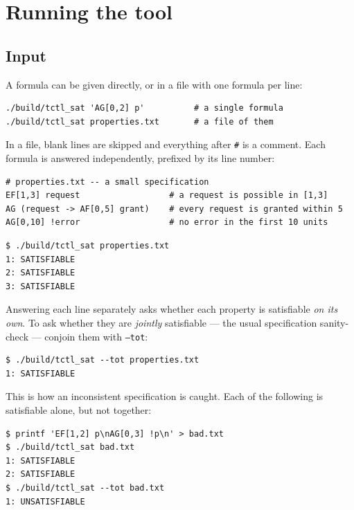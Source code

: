 \section{Running the tool}

\subsection{Input}

A formula can be given directly, or in a file with one formula per line:

\begin{lstlisting}
./build/tctl_sat 'AG[0,2] p'          # a single formula
./build/tctl_sat properties.txt       # a file of them
\end{lstlisting}

\noindent
In a file, blank lines are skipped and everything after \texttt{\#} is a
comment.  Each formula is answered independently, prefixed by its line number:

\begin{lstlisting}
# properties.txt -- a small specification
EF[1,3] request                  # a request is possible in [1,3]
AG (request -> AF[0,5] grant)    # every request is granted within 5
AG[0,10] !error                  # no error in the first 10 units
\end{lstlisting}

\begin{lstlisting}
$ ./build/tctl_sat properties.txt
1: SATISFIABLE
2: SATISFIABLE
3: SATISFIABLE
\end{lstlisting}

\noindent
Answering each line separately asks whether each property is satisfiable
\emph{on its own}.  To ask whether they are \emph{jointly} satisfiable --- the
usual specification sanity-check --- conjoin them with \texttt{--tot}:

\begin{lstlisting}
$ ./build/tctl_sat --tot properties.txt
1: SATISFIABLE
\end{lstlisting}

\noindent
This is how an inconsistent specification is caught.  Each of the following is
satisfiable alone, but not together:

\begin{lstlisting}
$ printf 'EF[1,2] p\nAG[0,3] !p\n' > bad.txt
$ ./build/tctl_sat bad.txt
1: SATISFIABLE
2: SATISFIABLE
$ ./build/tctl_sat --tot bad.txt
1: UNSATISFIABLE
\end{lstlisting}

